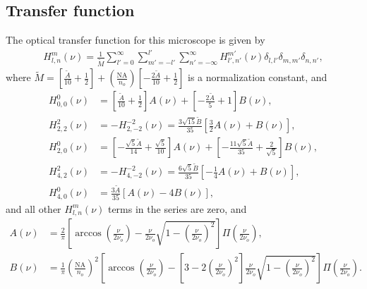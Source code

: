 \documentclass[11pt]{article}
\begin{document}
\subsection{Transfer function}
The optical transfer function for this microscope is given by
\begin{align}
  H_{l,n}^m(\nu) = \frac{1}{\tilde{M}}\sum_{l'=0}^{\infty}\sum_{m'=-l'}^{l'}\sum_{n'=-\infty}^{\infty} H_{l',n'}^{m'}(\nu)\delta_{l,l'}\delta_{m,m'}\delta_{n,n'},  
\end{align}
where
$\tilde{M} = \left[\frac{\tilde{A}}{10} + \frac{1}{2}\right] + \left(\frac{\text{NA}}{n_o}\right)\left[-\frac{2\tilde{A}}{10} + \frac{1}{2}\right]$ is a
normalization constant, and
\begin{align}
  H_{0,0}^0(\nu) &= \left[\frac{\tilde{A}}{10} + \frac{1}{2}\right]A(\nu) + \left[-\frac{2\tilde{A}}{5} + 1\right]B(\nu),\\
  H_{2,2}^{2}(\nu) &= -H_{2,-2}^{-2}(\nu) = \frac{3\sqrt{15}\tilde{B}}{35}\left[\frac{3}{2}A(\nu) + B(\nu)\right],\\
  H_{2,0}^0(\nu) &= \left[-\frac{\sqrt{5}\tilde{A}}{14} + \frac{\sqrt{5}}{10}\right]A(\nu) + \left[-\frac{11\sqrt{5}\tilde{A}}{35} + \frac{2}{\sqrt{5}}\right]B(\nu),\\
  H_{4,2}^{2}(\nu) &= -H_{4,-2}^{-2}(\nu) = \frac{6\sqrt{5}\tilde{B}}{35}\left[-\frac{1}{4}A(\nu) + B(\nu)\right],\\
  H_{4,0}^0(\nu) &= \frac{3\tilde{A}}{35}[A(\nu) - 4B(\nu)],
\end{align}
and all other $H_{l,n}^m(\nu)$ terms in the series are zero, and  
\begin{align}
  A(\nu) &= \frac{2}{\pi}\left[\arccos\left(\frac{\nu}{2\nu_o}\right) - \frac{\nu}{2\nu_o}\sqrt{1 - \left(\frac{\nu}{2\nu_o}\right)^2}\right]\Pi\left(\frac{\nu}{2\nu_o}\right),\\
  B(\nu) &= \frac{1}{\pi}\left(\frac{\text{NA}}{n_o}\right)^2\left[\arccos\left(\frac{\nu}{2\nu_o}\right) - \left[3 - 2\left(\frac{\nu}{2\nu_o}\right)^2\right]\frac{\nu}{2\nu_o} \sqrt{1 - \left(\frac{\nu}{2\nu_o}\right)^2}\right]\Pi\left(\frac{\nu}{2\nu_o}\right).                 
\end{align}
\end{document}
